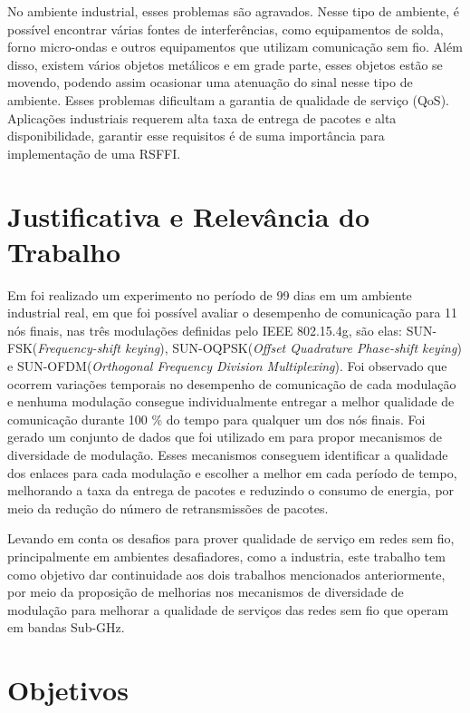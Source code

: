 No ambiente industrial, esses problemas são agravados. Nesse tipo de ambiente, é possível encontrar várias fontes de interferências, como equipamentos de solda, forno micro-ondas e outros equipamentos que utilizam comunicação sem fio\cite{gomes2014desafios}. Além disso, existem vários objetos metálicos e em grade parte, esses objetos estão se movendo, podendo assim ocasionar uma atenuação do sinal nesse tipo de ambiente\cite{gomes2012correlation}. Esses problemas dificultam a garantia de qualidade de serviço (QoS). Aplicações industriais requerem alta taxa de entrega de pacotes e alta disponibilidade, garantir esse requisitos é de suma importância para implementação de uma RSFFI\cite{gomes2017estimaccao}.

\section{Justificativa e Relevância do Trabalho}
\label{sec:justificativa}

Em \cite{tuset2020evaluating} foi realizado um experimento no período de 99 dias em um ambiente industrial real, em que foi possível avaliar o desempenho de comunicação para 11 nós finais, nas três modulações definidas pelo IEEE 802.15.4g, são elas: SUN-FSK(\textit{Frequency-shift keying}), SUN-OQPSK(\textit{Offset Quadrature Phase-shift keying}) e 
SUN-OFDM(\textit{Orthogonal Frequency Division Multiplexing}). Foi observado que ocorrem variações temporais no desempenho de comunicação de cada modulação e nenhuma modulação consegue individualmente entregar a melhor qualidade de comunicação durante 100 \% do tempo para qualquer um dos nós finais. Foi gerado um conjunto de dados que foi utilizado em \cite{gomes2020improving} para propor mecanismos de diversidade de modulação. Esses mecanismos conseguem identificar a qualidade dos enlaces para cada modulação e escolher a melhor em cada período de tempo, melhorando a taxa da entrega de pacotes e reduzindo o consumo de energia, por meio da redução do número de retransmissões de pacotes. 

Levando em conta os desafios para prover qualidade de serviço em redes sem fio, principalmente em ambientes desafiadores, como a industria, este trabalho tem como objetivo dar continuidade aos dois trabalhos mencionados anteriormente, por meio da proposição de melhorias nos mecanismos de diversidade de modulação para melhorar a qualidade de serviços das redes sem fio que operam em bandas Sub-GHz.   

\section{Objetivos}
\label{sec:objetivo}

